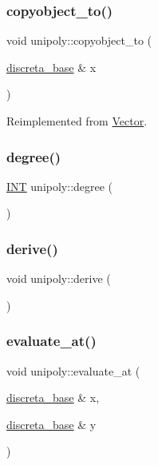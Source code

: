 \subsubsection{\texorpdfstring{copyobject\+\_\+to()}{copyobject\_to()}}
{\footnotesize\ttfamily void unipoly\+::copyobject\+\_\+to (\begin{DoxyParamCaption}\item[{\mbox{\hyperlink{classdiscreta__base}{discreta\+\_\+base}} \&}]{x }\end{DoxyParamCaption})\hspace{0.3cm}{\ttfamily [virtual]}}



Reimplemented from \mbox{\hyperlink{class_vector_af657307f3d344c8cef5d633335a5f484}{Vector}}.

\mbox{\label{classunipoly_ab2b9692ea17ce32c0c8f2cc246517e37}} 
\subsubsection{\texorpdfstring{degree()}{degree()}}
{\footnotesize\ttfamily \mbox{\hyperlink{galois_8h_a09fddde158a3a20bd2dcadb609de11dc}{I\+NT}} unipoly\+::degree (\begin{DoxyParamCaption}{ }\end{DoxyParamCaption})}

\mbox{\label{classunipoly_a52ae2730113a41ba434aa33d242ad2ae}} 
\subsubsection{\texorpdfstring{derive()}{derive()}}
{\footnotesize\ttfamily void unipoly\+::derive (\begin{DoxyParamCaption}{ }\end{DoxyParamCaption})}

\mbox{\label{classunipoly_afb8c65d96c3c1afeb1e14120bd5942b8}} 
\subsubsection{\texorpdfstring{evaluate\+\_\+at()}{evaluate\_at()}}
{\footnotesize\ttfamily void unipoly\+::evaluate\+\_\+at (\begin{DoxyParamCaption}\item[{\mbox{\hyperlink{classdiscreta__base}{discreta\+\_\+base}} \&}]{x,  }\item[{\mbox{\hyperlink{classdiscreta__base}{discreta\+\_\+base}} \&}]{y }\end{DoxyParamCaption})}

